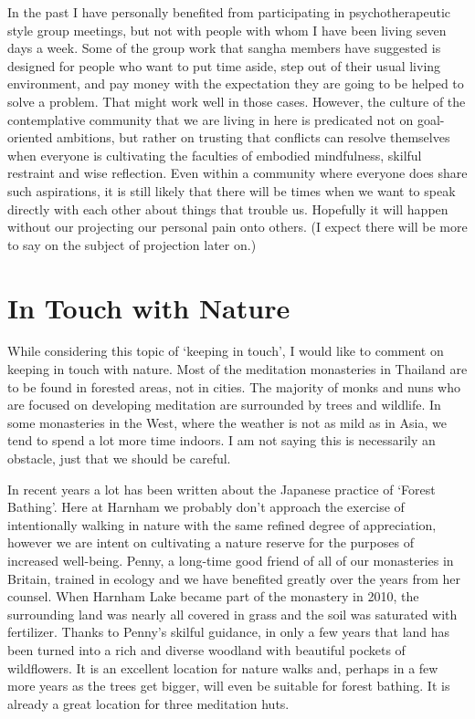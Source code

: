 In the past I have personally benefited from participating in
psychotherapeutic style group meetings, but not with people with whom I
have been living seven days a week. Some of the group work that sangha
members have suggested is designed for people who want to put time
aside, step out of their usual living environment, and pay money with
the expectation they are going to be helped to solve a problem. That
might work well in those cases. However, the culture of the
contemplative community that we are living in here is predicated not on
goal-oriented ambitions, but rather on trusting that conflicts can
resolve themselves when everyone is cultivating the faculties of
embodied mindfulness, skilful restraint and wise reflection. Even within
a community where everyone does share such aspirations, it is still
likely that there will be times when we want to speak directly with each
other about things that trouble us. Hopefully it will happen without our
projecting our personal pain onto others. (I expect there will be more
to say on the subject of projection later on.)

\section{In Touch with Nature}

While considering this topic of `keeping in touch', I would like to
comment on keeping in touch with nature. Most of the meditation
monasteries in Thailand are to be found in forested areas, not in
cities. The majority of monks and nuns who are focused on developing
meditation are surrounded by trees and wildlife. In some monasteries in
the West, where the weather is not as mild as in Asia, we tend to spend
a lot more time indoors. I am not saying this is necessarily an
obstacle, just that we should be careful.

In recent years a lot has been written about the Japanese practice of `Forest
Bathing'\cite{bathing}. Here at Harnham we probably don't approach the
exercise of intentionally walking in nature with the same refined degree
of appreciation, however we are intent on cultivating a nature reserve
for the purposes of increased well-being. Penny, a long-time good friend
of all of our monasteries in Britain, trained in ecology and we have
benefited greatly over the years from her counsel. When Harnham Lake
became part of the monastery in 2010, the surrounding land was nearly
all covered in grass and the soil was saturated with fertilizer. Thanks
to Penny's skilful guidance, in only a few years that land has been
turned into a rich and diverse woodland with beautiful pockets of
wildflowers. It is an excellent location for nature walks and, perhaps
in a few more years as the trees get bigger, will even be suitable for
forest bathing. It is already a great location for three meditation
huts.

